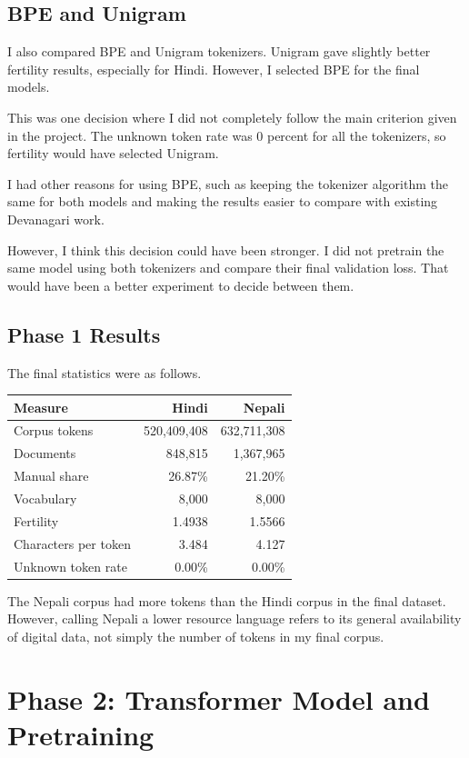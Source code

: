\documentclass[twocolumn, 10pt]{article}
\begin{document}
\subsection{BPE and Unigram}
I also compared BPE and Unigram tokenizers. Unigram gave slightly better fertility results, especially for Hindi. However, I selected BPE for the final models.

This was one decision where I did not completely follow the main criterion given in the project. The unknown token rate was 0 percent for all the tokenizers, so fertility would have selected Unigram.

I had other reasons for using BPE, such as keeping the tokenizer algorithm the same for both models and making the results easier to compare with existing Devanagari work.

However, I think this decision could have been stronger. I did not pretrain the same model using both tokenizers and compare their final validation loss. That would have been a better experiment to decide between them.

\subsection{Phase 1 Results}
The final statistics were as follows.

\begin{table}[h]
\centering
\begin{tabular}{lrr}
\toprule
Measure & Hindi & Nepali \\
\midrule
Corpus tokens & 520,409,408 & 632,711,308 \\
Documents & 848,815 & 1,367,965 \\
Manual share & 26.87\% & 21.20\% \\
Vocabulary & 8,000 & 8,000 \\
Fertility & 1.4938 & 1.5566 \\
Characters per token & 3.484 & 4.127 \\
Unknown token rate & 0.00\% & 0.00\% \\
\bottomrule
\end{tabular}
\end{table}

The Nepali corpus had more tokens than the Hindi corpus in the final dataset. However, calling Nepali a lower resource language refers to its general availability of digital data, not simply the number of tokens in my final corpus.

\section{Phase 2: Transformer Model and Pretraining}
\end{document}
